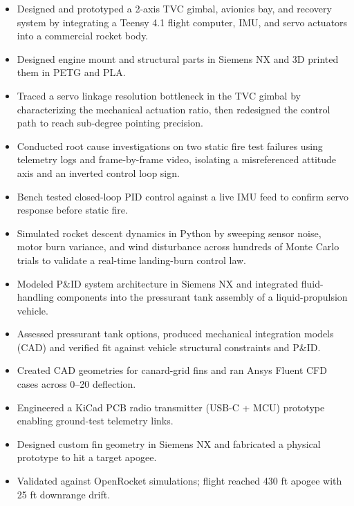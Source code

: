 \begin{itemize}
  \item Designed and prototyped a 2-axis TVC gimbal, avionics bay, and recovery system by integrating a Teensy 4.1 flight computer, IMU, and servo actuators into a commercial rocket body.
  \item Designed engine mount and structural parts in Siemens NX and 3D printed them in PETG and PLA.
  \item Traced a servo linkage resolution bottleneck in the TVC gimbal by characterizing the mechanical actuation ratio, then redesigned the control path to reach sub-degree pointing precision.
  \item Conducted root cause investigations on two static fire test failures using telemetry logs and frame-by-frame video, isolating a misreferenced attitude axis and an inverted control loop sign.
  \item Bench tested closed-loop PID control against a live IMU feed to confirm servo response before static fire.
  \item Simulated rocket descent dynamics in Python by sweeping sensor noise, motor burn variance, and wind disturbance across hundreds of Monte Carlo trials to validate a real-time landing-burn control law.
\end{itemize}
\entrygap

\begin{itemize}
  \item Modeled P\&ID system architecture in Siemens NX and integrated fluid-handling components into the pressurant tank assembly of a liquid-propulsion vehicle.
  \item Assessed pressurant tank options, produced mechanical integration models (CAD) and verified fit against vehicle structural constraints and P\&ID.
  \item Created CAD geometries for canard-grid fins and ran Ansys Fluent CFD cases across 0--20\textdegree{} deflection.
  \item Engineered a KiCad PCB radio transmitter (USB-C + MCU) prototype enabling ground-test telemetry links.
\end{itemize}
\entrygap

\begin{itemize}
  \item Designed custom fin geometry in Siemens NX and fabricated a physical prototype to hit a target apogee.
  \item Validated against OpenRocket simulations; flight reached 430 ft apogee with 25 ft downrange drift.
\end{itemize}
\entrygap

